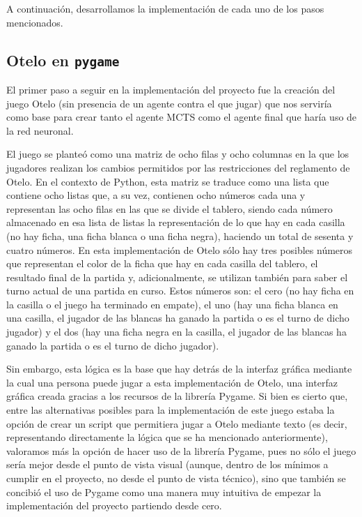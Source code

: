\documentclass[conference]{IEEEtran}
\begin{document}
A continuación, desarrollamos la implementación de cada uno de los pasos mencionados.

\subsection{Otelo en \texttt{pygame}}
El primer paso a seguir en la implementación del proyecto fue la creación del juego Otelo (sin presencia de un agente contra el que jugar) que nos serviría como base para crear tanto el agente MCTS como el agente final que haría uso de la red neuronal.

El juego se planteó como una matriz de ocho filas y ocho columnas en la que los jugadores realizan los cambios permitidos por las restricciones del reglamento de Otelo. En el contexto de Python, esta matriz se traduce como una lista que contiene ocho listas que, a su vez, contienen ocho números cada una y representan las ocho filas en las que se divide el tablero, siendo cada número almacenado en esa lista de listas la representación de lo que hay en cada casilla (no hay ficha, una ficha blanca o una ficha negra), haciendo un total de sesenta y cuatro números. En esta implementación de Otelo sólo hay tres posibles números que representan el color de la ficha que hay en cada casilla del tablero, el resultado final de la partida y, adicionalmente, se utilizan también para saber el turno actual de una partida en curso. Estos números son: el cero (no hay ficha en la casilla o el juego ha terminado en empate), el uno (hay una ficha blanca en una casilla, el jugador de las blancas ha ganado la partida o es el turno de dicho jugador) y el dos (hay una ficha negra en la casilla, el jugador de las blancas ha ganado la partida o es el turno de dicho jugador).

Sin embargo, esta lógica es la base que hay detrás de la interfaz gráfica mediante la cual una persona puede jugar a esta implementación de Otelo, una interfaz gráfica creada gracias a los recursos de la librería Pygame. Si bien es cierto que, entre las alternativas posibles para la implementación de este juego estaba la opción de crear un script que permitiera jugar a Otelo mediante texto (es decir, representando directamente la lógica que se ha mencionado anteriormente), valoramos más la opción de hacer uso de la librería Pygame, pues no sólo el juego sería mejor desde el punto de vista visual (aunque, dentro de los mínimos a cumplir en el proyecto, no desde el punto de vista técnico), sino que también se concibió el uso de Pygame como una manera muy intuitiva de empezar la implementación del proyecto partiendo desde cero.
\end{document}
